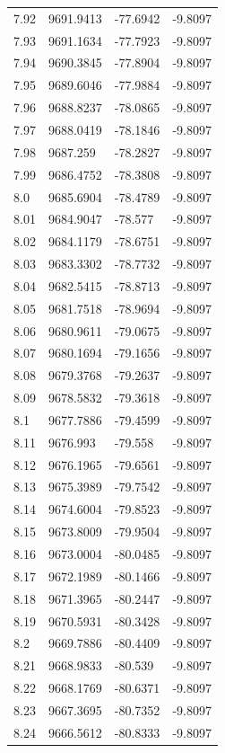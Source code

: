 \begin{table}[H]
\begin{tabular}{llll}
7.92 & 9691.9413 & -77.6942 & -9.8097 \\
7.93 & 9691.1634 & -77.7923 & -9.8097 \\
7.94 & 9690.3845 & -77.8904 & -9.8097 \\
7.95 & 9689.6046 & -77.9884 & -9.8097 \\
7.96 & 9688.8237 & -78.0865 & -9.8097 \\
7.97 & 9688.0419 & -78.1846 & -9.8097 \\
7.98 & 9687.259 & -78.2827 & -9.8097 \\
7.99 & 9686.4752 & -78.3808 & -9.8097 \\
8.0 & 9685.6904 & -78.4789 & -9.8097 \\
8.01 & 9684.9047 & -78.577 & -9.8097 \\
8.02 & 9684.1179 & -78.6751 & -9.8097 \\
8.03 & 9683.3302 & -78.7732 & -9.8097 \\
8.04 & 9682.5415 & -78.8713 & -9.8097 \\
8.05 & 9681.7518 & -78.9694 & -9.8097 \\
8.06 & 9680.9611 & -79.0675 & -9.8097 \\
8.07 & 9680.1694 & -79.1656 & -9.8097 \\
8.08 & 9679.3768 & -79.2637 & -9.8097 \\
8.09 & 9678.5832 & -79.3618 & -9.8097 \\
8.1 & 9677.7886 & -79.4599 & -9.8097 \\
8.11 & 9676.993 & -79.558 & -9.8097 \\
8.12 & 9676.1965 & -79.6561 & -9.8097 \\
8.13 & 9675.3989 & -79.7542 & -9.8097 \\
8.14 & 9674.6004 & -79.8523 & -9.8097 \\
8.15 & 9673.8009 & -79.9504 & -9.8097 \\
8.16 & 9673.0004 & -80.0485 & -9.8097 \\
8.17 & 9672.1989 & -80.1466 & -9.8097 \\
8.18 & 9671.3965 & -80.2447 & -9.8097 \\
8.19 & 9670.5931 & -80.3428 & -9.8097 \\
8.2 & 9669.7886 & -80.4409 & -9.8097 \\
8.21 & 9668.9833 & -80.539 & -9.8097 \\
8.22 & 9668.1769 & -80.6371 & -9.8097 \\
8.23 & 9667.3695 & -80.7352 & -9.8097 \\
8.24 & 9666.5612 & -80.8333 & -9.8097 \\

\end{tabular}
\end{table}

